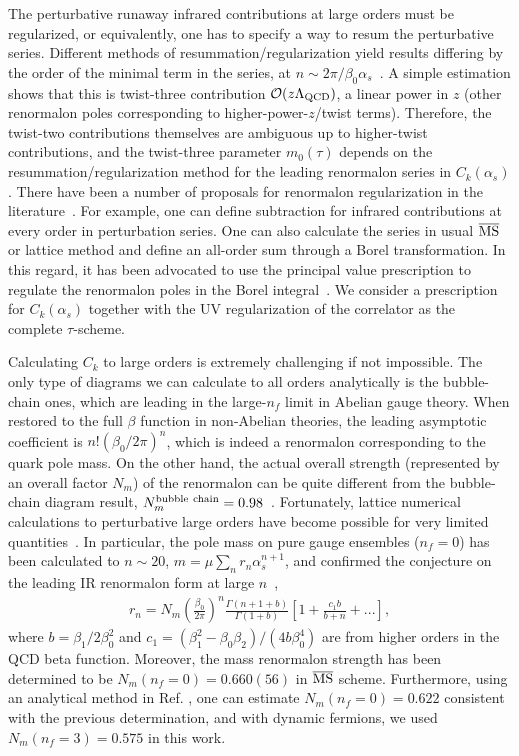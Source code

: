\documentclass[prd,aps,nofootinbib,superscriptaddress,floatfix,preprintnumbers,twocolumn]{revtex4}
\begin{document}
The perturbative runaway infrared contributions at large orders must be regularized, or equivalently, one has to specify a way to resum the perturbative series. Different methods of resummation/regularization 
yield results differing by the order of the minimal term in the series, at $n\sim 2\pi/\beta_0\alpha_s$~\cite{Beneke:1992ch}.
A simple estimation shows that this is twist-three contribution ${\cal O}(z\Lambda_{\rm QCD})$, a linear power in $z$ (other renormalon poles corresponding to higher-power-$z$/twist terms). Therefore, the twist-two contributions themselves are ambiguous up to higher-twist contributions, and the twist-three parameter $m_0(\tau)$ depends on the resummation/regularization method for the leading renormalon series in $C_k(\alpha_s)$. 
There have been a number of proposals for renormalon regularization in the literature~\cite{Beneke:1998ui}. For example, one can define subtraction for infrared contributions at every order in perturbation series. One can also 
calculate the series in usual $\overline{\rm MS}$ or lattice method and define an all-order sum through a Borel transformation. In this regard, it has been advocated to use the principal value prescription to regulate the renormalon poles in the Borel integral~\cite{Ayala:2019uaw,Ayala:2020pxq}. We consider a prescription for $C_k(\alpha_s)$ together with the UV regularization of the correlator as the complete $\tau$-scheme.

Calculating $C_{k}$ to large orders is extremely challenging if not impossible. The only type of diagrams we can calculate to all orders analytically is the bubble-chain ones, which are leading in the large-$n_f$ limit in Abelian gauge theory. When restored to the full $\beta$ function in non-Abelian theories, the leading asymptotic coefficient is $ n!(\beta_0/2\pi)^n$, which is indeed a renormalon corresponding to the quark pole mass.  On the other hand, the actual overall strength (represented by an overall factor $N_m$) of the renormalon 
can be quite different from the bubble-chain diagram result,
$N_m^{\rm bubble~chain}=0.98$~\cite{Beneke:1994rs}. 
Fortunately, lattice numerical calculations to perturbative large orders have become possible for very limited quantities~\cite{Bali:2013pla,Bali:2014fea}. In particular, the pole mass on pure gauge ensembles ($n_f=0$) has been calculated to $n\sim 20$, $m = \mu \sum_n r_n\alpha_s^{n+1}$, and confirmed the conjecture on the leading IR renormalon form at large $n$~\cite{Bali:2013pla}, 
\begin{align}
    r_n = N_m \left(\frac{\beta_0}{2\pi}\right)^n
    \frac{\Gamma(n+1+b)}{\Gamma(1+b)}
    \left[1+\frac{c_1b}{b+n} +...\right],
\end{align} 
where $b=\beta_1/2\beta_0^2$ and $c_1=(\beta_1^2-\beta_0\beta_2)/(4b\beta^4_0)$ are from higher orders in the QCD beta function. Moreover, 
the mass renormalon strength has been determined to be $N_m(n_f=0)=0.660(56)$ in $\overline{\rm MS}$ scheme. Furthermore, using an analytical method 
in Ref. \cite{Pineda:2001zq}, one can estimate $N_m(n_f=0)=0.622$ consistent with the previous determination, and with dynamic fermions, we used $N_m(n_f=3) =0.575$ in this work. 
\end{document}
